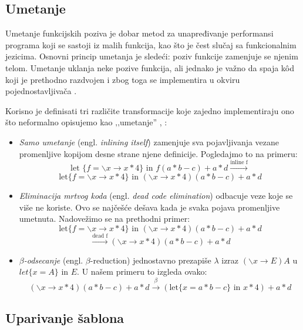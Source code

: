 \subsection{Umetanje}
Umetanje funkcijskih poziva je dobar metod za unapređivanje performansi programa koji se sastoji iz malih funkcija, kao što je čest slučaj sa funkcionalnim jezicima. Osnovni princip umetanja je sledeći: poziv funkcije zamenjuje se njenim telom. Umetanje uklanja neke pozive funkcija, ali jednako je važno da spaja k\^ od koji je prethodno razdvojen i zbog toga se implementira u okviru pojednostavljivača \cite{compilation-by-program-transformation}.

Korisno je definisati tri različite transformacije koje zajedno implementiraju ono što neformalno opisujemo kao ‚‚umetanje'' \cite{secrets-haskell-compiler-inliner, compilation-by-program-transformation}, :
\begin{itemize}
	\item \textit{Samo umetanje} (engl. \textit{inlining itself}) zamenjuje sva pojavljivanja vezane promenljive kopijom desne strane njene definicije. Pogledajmo to na primeru:
	$$ \text{let } \{ f = \backslash x \longrightarrow x*4 \} \text{ in } f (a*b - c) + a*d \stackrel{\text{inline f}}{\longrightarrow} $$
	$$\text{let} \{ f = \backslash x \longrightarrow x*4 \} \text{ in } (\backslash x \longrightarrow x*4) (a*b - c) + a*d$$
	
	\item \textit{Eliminacija mrtvog koda} (engl. \textit{dead code elimination}) odbacuje veze koje se više ne koriste. Ovo se najčešće dešava kada je svaka pojava promenljive umetnuta. Nadovežimo se na prethodni primer:
	$$\text{let} \{ f = \backslash x \longrightarrow x*4 \} \text{ in } (\backslash x \longrightarrow x*4) (a*b - c) + a*d $$ 
	$$\stackrel{\text{dead f}}{\longrightarrow}  (\backslash x \longrightarrow x*4) (a*b - c) + a*d $$
	
	\item \textit{$\beta$-odsecanje} (engl. \textit{$\beta$}-reduction) jednostavno prezapiše $\lambda$ izraz $(\backslash x \longrightarrow E) A$ u $let \{x = A\} \text{ in } E$. U našem primeru to izgleda ovako:
	$$(\backslash x \longrightarrow x*4) (a*b - c) + a*d \stackrel{\beta}{\longrightarrow} (\text{let} \{ x = a*b - c \} \text{ in } x*4) + a*d $$
\end{itemize}


\subsection{Uparivanje šablona}

